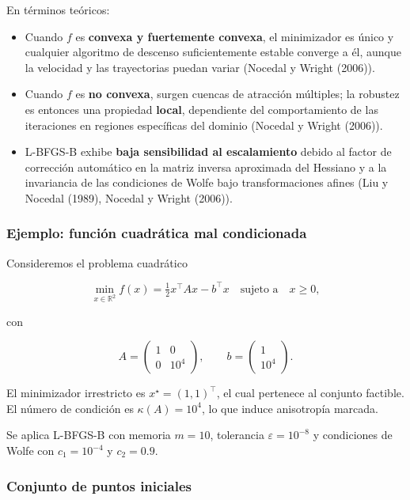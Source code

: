 \documentclass[
  spanish,
  us-letterpaper,
  DIV=11,
  numbers=noendperiod]{scrreprt}
\providecommand{\tightlist}{%
  \setlength{\itemsep}{0pt}\setlength{\parskip}{0pt}}
\numberwithin{equation}{section}
\begin{document}
En términos teóricos:

\begin{itemize}
\tightlist
\item
  Cuando \(f\) es \textbf{convexa y fuertemente convexa}, el minimizador
  es único y cualquier algoritmo de descenso suficientemente estable
  converge a él, aunque la velocidad y las trayectorias puedan variar
  (Nocedal y Wright (2006)).
\item
  Cuando \(f\) es \textbf{no convexa}, surgen cuencas de atracción
  múltiples; la robustez es entonces una propiedad \textbf{local},
  dependiente del comportamiento de las iteraciones en regiones
  específicas del dominio (Nocedal y Wright (2006)).
\item
  L-BFGS-B exhibe \textbf{baja sensibilidad al escalamiento} debido al
  factor de corrección automático en la matriz inversa aproximada del
  Hessiano y a la invariancia de las condiciones de Wolfe bajo
  transformaciones afines (Liu y Nocedal (1989), Nocedal y Wright
  (2006)).
\end{itemize}

\subsubsection{Ejemplo: función cuadrática mal
condicionada}\label{ejemplo-funciuxf3n-cuadruxe1tica-mal-condicionada}

Consideremos el problema cuadrático

\[
\min_{x \in \mathbb{R}^2} f(x) = \tfrac{1}{2} x^\top A x - b^\top x
\quad \text{sujeto a} \quad x \ge 0,
\]

con

\[
A = 
\begin{pmatrix}
1 & 0 \\
0 & 10^4
\end{pmatrix},
\qquad
b =
\begin{pmatrix}
1 \\ 10^4
\end{pmatrix}.
\]

El minimizador irrestricto es \(x^\star = (1,1)^\top\), el cual
pertenece al conjunto factible. El número de condición es
\(\kappa(A) = 10^4\), lo que induce anisotropía marcada.

Se aplica L-BFGS-B con memoria \(m = 10\), tolerancia
\(\varepsilon = 10^{-8}\) y condiciones de Wolfe con \(c_1 = 10^{-4}\) y
\(c_2 = 0.9\).

\subsubsection{Conjunto de puntos
iniciales}\label{conjunto-de-puntos-iniciales}
\end{document}

